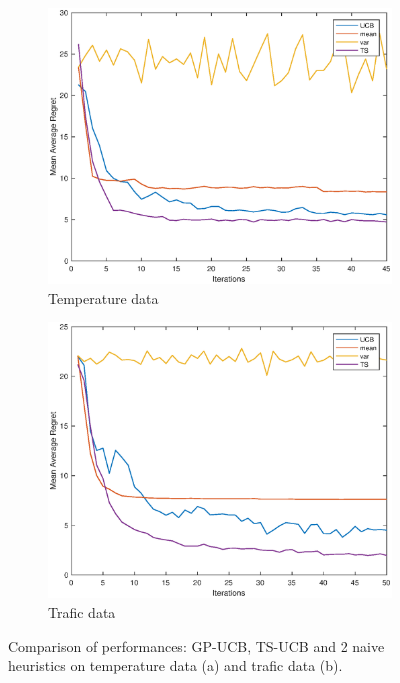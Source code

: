 \documentclass{article} %
\begin{document}
\begin{figure}[h!]
  \begin{subfigure}[b]{0.5\linewidth}
    \centering 
    \includegraphics[width=1\linewidth]{figures/temperature_MC_150_kernel_empirical.eps} 
    \caption{Temperature data} 
    \label{temperature_data} 
    \vspace{4ex}
  \end{subfigure}
  \begin{subfigure}[b]{0.5\linewidth}
    \centering
    \includegraphics[width=1\linewidth]{figures/trafic_MC_360_kernel_empirical.eps} 
    \caption{Trafic data} 
    \label{trafic_data} 
    \vspace{4ex}
  \end{subfigure} 
 \caption{Comparison of performances: GP-UCB, TS-UCB and 2 naive heuristics on temperature data (a) and trafic data (b).} 
 \label{results_real} 
\end{figure}
\end{document}
